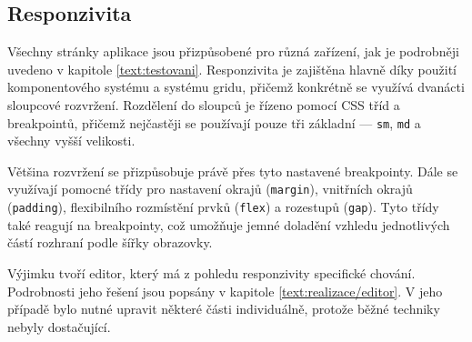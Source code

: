 


\subsection{Responzivita}\label{text:realizace/responzivita}


Všechny stránky aplikace jsou přizpůsobené pro různá zařízení, jak je podrobněji uvedeno v kapitole \ref{text:testovani}. 
Responzivita je zajištěna hlavně díky použití komponentového systému a systému gridu, přičemž konkrétně se využívá dvanácti sloupcové rozvržení. 
Rozdělení do sloupců je řízeno pomocí CSS tříd a breakpointů, přičemž nejčastěji se používají pouze tři základní — \texttt{sm}, \texttt{md} a všechny vyšší velikosti.

Většina rozvržení se přizpůsobuje právě přes tyto nastavené breakpointy. 
Dále se využívají pomocné třídy pro nastavení okrajů (\texttt{margin}), vnitřních okrajů (\texttt{padding}), flexibilního rozmístění prvků (\texttt{flex}) a rozestupů (\texttt{gap}). 
Tyto třídy také reagují na breakpointy, což umožňuje jemné doladění vzhledu jednotlivých částí rozhraní podle šířky obrazovky.

Výjimku tvoří editor, který má z pohledu responzivity specifické chování. 
Podrobnosti jeho řešení jsou popsány v kapitole \ref{text:realizace/editor}. 
V jeho případě bylo nutné upravit některé části individuálně, protože běžné techniky nebyly dostačující.



